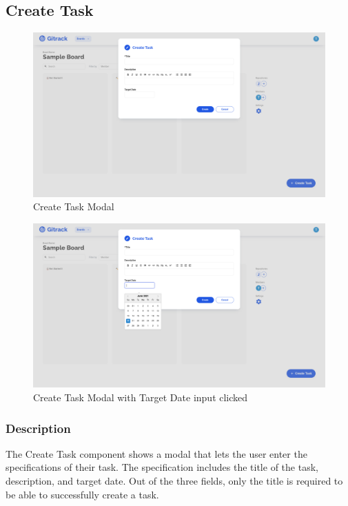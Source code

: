 \documentclass{article}
\begin{document}
\subsection{Create Task}
\begin{figure}[H]
	\includegraphics[width=1\textwidth]{create-task}\par\vspace{0.5cm}
	\caption{Create Task Modal}
	\label{fig:create-task}
\end{figure}

\begin{figure}[H]
	\includegraphics[width=1\textwidth]{create-task-date}\par\vspace{0.5cm}
	\caption{Create Task Modal with Target Date input clicked}
	\label{fig:create-task-date}
\end{figure}

\subsubsection{Description}
The Create Task component shows a modal that lets the user enter the
specifications of their task. The specification includes the title of the task,
description, and target date. Out of the three fields, only the title is
required to be able to successfully create a task.
\end{document}
